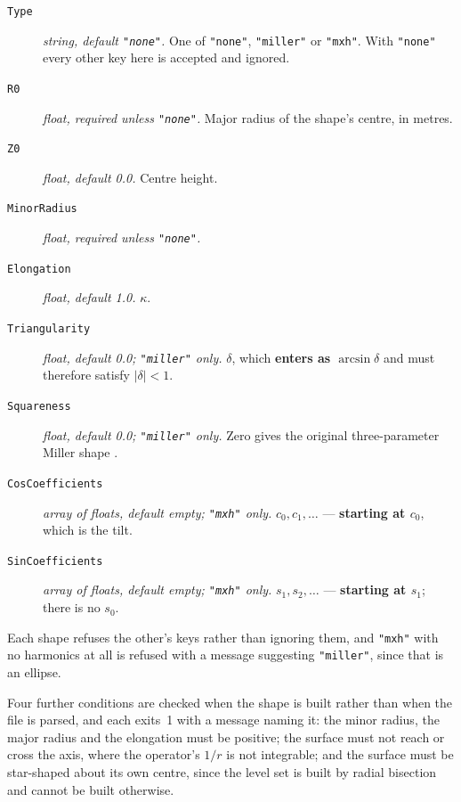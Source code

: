 \begin{description}

\item[\texttt{Type}] \emph{string, default \texttt{"none"}.} One of
	\texttt{"none"}, \texttt{"miller"} or \texttt{"mxh"}. With \texttt{"none"}
	every other key here is accepted and ignored.

\item[\texttt{R0}] \emph{float, required unless \texttt{"none"}.} Major radius
	of the shape's centre, in metres.

\item[\texttt{Z0}] \emph{float, default 0.0.} Centre height.

\item[\texttt{MinorRadius}] \emph{float, required unless \texttt{"none"}.}

\item[\texttt{Elongation}] \emph{float, default 1.0.} $\kappa$.

\item[\texttt{Triangularity}] \emph{float, default 0.0; \texttt{"miller"} only.}
	$\delta$, which \textbf{enters as $\arcsin\delta$} and must therefore
	satisfy $|\delta| < 1$.

\item[\texttt{Squareness}] \emph{float, default 0.0; \texttt{"miller"} only.}
	Zero gives the original three-parameter Miller shape \cite{Miller1998}.

\item[\texttt{CosCoefficients}] \emph{array of floats, default empty;
	\texttt{"mxh"} only.} $c_0, c_1, \ldots$ --- \textbf{starting at $c_0$},
	which is the tilt.

\item[\texttt{SinCoefficients}] \emph{array of floats, default empty;
	\texttt{"mxh"} only.} $s_1, s_2, \ldots$ --- \textbf{starting at $s_1$};
	there is no $s_0$.

\end{description}

Each shape refuses the other's keys rather than ignoring them, and
\texttt{"mxh"} with no harmonics at all is refused with a message suggesting
\texttt{"miller"}, since that is an ellipse.

Four further conditions are checked when the shape is built rather than when the
file is parsed, and each exits~1 with a message naming it: the minor radius, the
major radius and the elongation must be positive; the surface must not reach or
cross the axis, where the operator's $1/r$ is not integrable; and the surface
must be star-shaped about its own centre, since the level set is built by radial
bisection and cannot be built otherwise.

